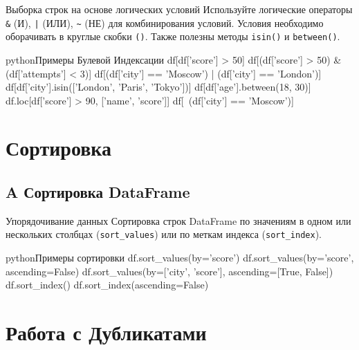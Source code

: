 \begin{myexampleblock}{Выборка строк на основе логических условий}
    Используйте логические операторы \texttt{\&} (И), \texttt{|} (ИЛИ), \texttt{\textasciitilde} (НЕ) для комбинирования условий. Условия необходимо оборачивать в круглые скобки \texttt{()}. Также полезны методы \texttt{isin()} и \texttt{between()}.
    \begin{codebox}{python}{Примеры Булевой Индексации}
    df[df['score'] > 50]
    df[(df['score'] > 50) & (df['attempts'] < 3)]
    df[(df['city'] == 'Moscow') | (df['city'] == 'London')]
    df[df['city'].isin(['London', 'Paris', 'Tokyo'])]
    df[df['age'].between(18, 30)]
    df.loc[df['score'] > 90, ['name', 'score']]
    df[~(df['city'] == 'Moscow')]
    \end{codebox}
\end{myexampleblock}

\section{Сортировка}

\subsection{A Сортировка DataFrame}

\begin{myblock}{Упорядочивание данных}
    Сортировка строк DataFrame по значениям в одном или нескольких столбцах (\texttt{sort\_values}) или по меткам индекса (\texttt{sort\_index}).
    \begin{codebox}{python}{Примеры сортировки}
    df.sort_values(by='score')
    df.sort_values(by='score', ascending=False)
    df.sort_values(by=['city', 'score'], ascending=[True, False])
    df.sort_index()
    df.sort_index(ascending=False)
    \end{codebox}
\end{myblock}

\section{Работа с Дубликатами}

